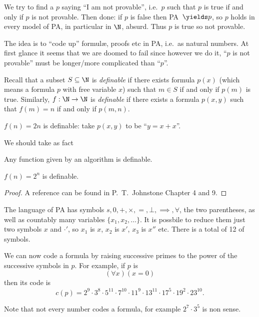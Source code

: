 \documentclass[a4paper]{article}
\begin{document}
We try to find a \(p\) saying ``I am not provable'', i.e.\ \(p\) such that \(p\) is true if and only if \(p\) is not provable. Then done: if \(p\) is false then PA~\(\yields p\), so \(p\) holds in every model of PA, in particular in \(\N\), absurd. Thus \(p\) is true so not provable.

The idea is to ``code up'' formulæ, proofs etc in PA, i.e.\ as natural numbers. At first glance it seems that we are doomed to fail since however we do it, ``\(p\) is not provable'' must be longer/more complicated than ``\(p\)''.

Recall that a subset \(S \subseteq \N\) is \emph{definable} if there exists formula \(p(x)\) (which means a formula \(p\) with free variable \(x\)) such that \(m \in S\) if and only if \(p(m)\) is true. Similarly, \(f: \N \to \N\) is \emph{definable} if there exists a formula \(p(x, y)\) such that \(f(m) = n\) if and only if \(p(m, n)\).

\begin{eg}
  \(f(n) = 2n\) is definable: take \(p(x, y)\) to be ``\(y = x + x\)''.
\end{eg}

We should take as fact

\begin{proposition}
  Any function given by an algorithm is definable.
\end{proposition}

\begin{eg}
  \(f(n) = 2^n\) is definable.
\end{eg}

\begin{proof}
  A reference can be found in P.\ T.\ Johnstone Chapter 4 and 9.
\end{proof}

The language of PA has symbols \(s, 0, +, \times, =, \bot, \implies, \forall\), the two parentheses, as well as countably many variables \(\{x_1, x_2, \dots\}\). It is possbile to reduce them just two symbols \(x\) and \(\cdot '\), so \(x_1\) is \(x\), \(x_2\) is \(x'\), \(x_3\) is \(x''\) etc. There is a total of 12 of symbols.

We can now code a formula by raising successive primes to the power of the successive symbols in \(p\). For example, if \(p\) is
\[
  (\forall x) (x = 0)
\]
then its code is
\[
  c(p) = 2^9 \cdot 3^8 \cdot 5^{11} \cdot 7^{10} \cdot 11^9 \cdot 13^{11} \cdot 17^5 \cdot 19^2 \cdot 23^{10}.
\]

Note that not every number codes a formula, for example \(2^7 \cdot 3^5\) is non sense.
\end{document}
